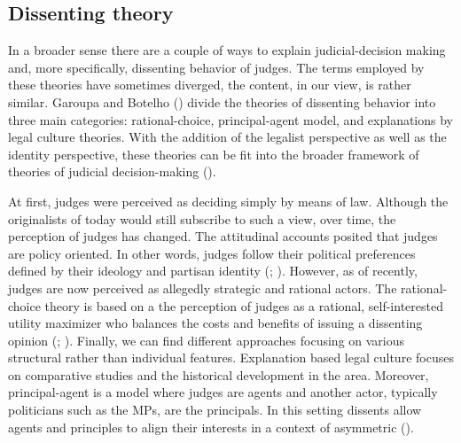 \documentclass[
  11pt,
]{article}
\begin{document}
\subsection{Dissenting theory}\label{theory-dissent}

In a broader sense there are a couple of ways to explain judicial-decision making and, more specifically, dissenting behavior of judges. The terms employed by these theories have sometimes diverged, the content, in our view, is rather similar. Garoupa and Botelho () divide the theories of dissenting behavior into three main categories: rational-choice, principal-agent model, and explanations by legal culture theories. With the addition of the legalist perspective as well as the identity perspective, these theories can be fit into the broader framework of theories of judicial decision-making ().

At first, judges were perceived as deciding simply by means of law. Although the originalists of today would still subscribe to such a view, over time, the perception of judges has changed. The attitudinal accounts posited that judges are policy oriented. In other words, judges follow their political preferences defined by their ideology and partisan identity (; ). However, as of recently, judges are now perceived as allegedly strategic and rational actors. The rational-choice theory is based on a the perception of judges as a rational, self-interested utility maximizer who balances the costs and benefits of issuing a dissenting opinion (; ). Finally, we can find different approaches focusing on various structural rather than individual features. Explanation based legal culture focuses on comparative studies and the historical development in the area. Moreover, principal-agent is a model where judges are agents and another actor, typically politicians such as the MPs, are the principals. In this setting dissents allow agents and principles to align their interests in a context of asymmetric ().
\end{document}
